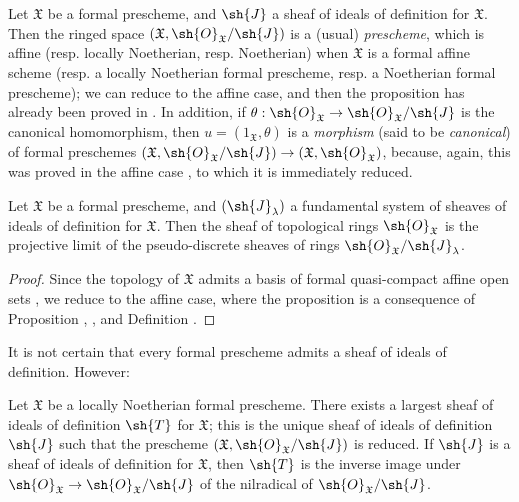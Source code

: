 \begin{env}[10.5.2]
\label{I.10.5.2}
Let $\mathfrak{X}$ be a formal prescheme, and $\sh{J}$ a sheaf of ideals of definition for $\mathfrak{X}$.
Then the ringed space $(\mathfrak{X},\sh{O}_\mathfrak{X}/\sh{J})$ is a (usual) \emph{prescheme}, which is affine (resp. locally Noetherian, resp. Noetherian) when $\mathfrak{X}$ is a formal affine scheme (resp. a locally Noetherian formal prescheme, resp. a Noetherian formal prescheme);  we can reduce to the affine case, and then the proposition has already been proved in .
In addition, if $\theta:\sh{O}_\mathfrak{X}\to\sh{O}_\mathfrak{X}/\sh{J}$ is the canonical homomorphism, then $u=(1_\mathfrak{X},\theta)$ is a \emph{morphism} (said to be \emph{canonical}) of formal preschemes $(\mathfrak{X},\sh{O}_\mathfrak{X}/\sh{J})\to(\mathfrak{X},\sh{O}_\mathfrak{X})$, because, again, this was proved in the affine case , to which it is immediately reduced.
\end{env}

\begin{proposition}[10.5.3]
\label{I.10.5.3}
Let $\mathfrak{X}$ be a formal prescheme, and $(\sh{J}_\lambda)$ a fundamental system of sheaves of ideals of definition for $\mathfrak{X}$.
Then the sheaf of topological rings $\sh{O}_\mathfrak{X}$ is the projective limit of the pseudo-discrete sheaves of rings  $\sh{O}_\mathfrak{X}/\sh{J}_\lambda$.
\end{proposition}

\begin{proof}
Since the topology of $\mathfrak{X}$ admits a basis of formal quasi-compact affine open sets , we reduce to the affine case, where the proposition is a consequence of Proposition , , and Definition .
\end{proof}

It is not certain that every formal prescheme admits a sheaf of ideals of definition.
However:
\begin{proposition}[10.5.4]
\label{I.10.5.4}
Let $\mathfrak{X}$ be a locally Noetherian formal prescheme.
There exists a largest sheaf of ideals of definition $\sh{T}$ for $\mathfrak{X}$; this is the unique sheaf of ideals of definition $\sh{J}$ such that the prescheme $(\mathfrak{X},\sh{O}_\mathfrak{X}/\sh{J})$ is reduced.
If $\sh{J}$ is a sheaf of ideals of definition for $\mathfrak{X}$, then $\sh{T}$ is the inverse image under $\sh{O}_\mathfrak{X}\to\sh{O}_\mathfrak{X}/\sh{J}$ of the nilradical of $\sh{O}_\mathfrak{X}/\sh{J}$.
\end{proposition}

